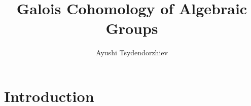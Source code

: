 
\title{Galois Cohomology of Algebraic Groups}
\author[Ayushi Tsydendorzhiev]{Ayushi Tsydendorzhiev}
\usepackage{enumitem}
\usepackage{stmaryrd}
\usepackage{xhfill}
\usepackage{array}
\usepackage{outlines}
\usepackage{faktor}
\usepackage{float}
\usepackage{mathtools}
\usepackage{tikz-cd}
\usepackage{centernot}
\usepackage{cancel}
\newcommand{\ra}{\rightarrow}
\newcommand{\lra}{\longrightarrow}
\newcommand{\eps}{\varepsilon}
\renewcommand{\P}{\mathbb{P}}
\newcommand{\acts}{\curvearrowright}
\newcommand\Gal[1]{\operatorname{Gal}({#1})}
\renewcommand{\phi}{\varphi}



\maketitle

\tableofcontents
\clearpage

\section{Introduction}

